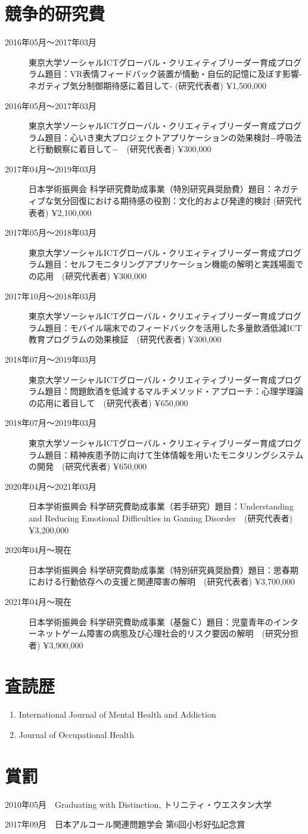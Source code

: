 \documentclass{article}
\begin{document}
\section{競争的研究費}
\begin{description}
	\item [2016年05月〜2017年03月]	 東京大学ソーシャルICTグローバル・クリエィティブリーダー育成プログラム題目：VR表情フィードバック装置が情動・自伝的記憶に及ぼす影響-ネガティブ気分制御期待感に着目して- (研究代表者) ¥1,500,000
	\item [2016年05月〜2017年03月] 東京大学ソーシャルICTグローバル・クリエィティブリーダー育成プログラム題目：心いき東大プロジェクトアプリケーションの効果検討−呼吸法と行動観察に着目して−　(研究代表者) ¥300,000
	\item [2017年04月〜2019年03月] 日本学術振興会 科学研究費助成事業（特別研究員奨励費）題目：ネガティブな気分回復における期待感の役割：文化的および発達的検討 (研究代表者) ¥2,100,000
	\item [2017年05月〜2018年03月] 東京大学ソーシャルICTグローバル・クリエィティブリーダー育成プログラム題目：セルフモニタリングアプリケーション機能の解明と実践場面での応用　(研究代表者) ¥300,000
	\item [2017年10月〜2018年03月] 東京大学ソーシャルICTグローバル・クリエィティブリーダー育成プログラム題目：モバイル端末でのフィードバックを活用した多量飲酒低減ICT教育プログラムの効果検証　(研究代表者) ¥300,000
	\item [2018年07月〜2019年03月] 東京大学ソーシャルICTグローバル・クリエィティブリーダー育成プログラム題目：問題飲酒を低減するマルチメソッド・アプローチ：心理学理論の応用に着目して　(研究代表者) ¥650,000
	\item [2018年07月〜2019年03月] 東京大学ソーシャルICTグローバル・クリエィティブリーダー育成プログラム題目：精神疾患予防に向けて生体情報を用いたモニタリングシステムの開発　(研究代表者) ¥650,000
	\item [2020年04月〜2021年03月] 日本学術振興会 科学研究費助成事業（若手研究）題目：Understanding and Reducing Emotional Difficulties in Gaming Disorder　(研究代表者)　¥3,200,000
	\item [2020年04月〜現在] 日本学術振興会 科学研究費助成事業（特別研究員奨励費）題目：思春期における行動依存への支援と関連障害の解明　(研究代表者) ¥3,700,000
	\item [2021年04月〜現在] 日本学術振興会 科学研究費助成事業（基盤Ｃ）題目：児童青年のインターネットゲーム障害の病態及び心理社会的リスク要因の解明　(研究分担者) ¥3,900,000
\end{description}

\section{査読歴}
	\begin{enumerate}
	\item International Journal of Mental Health and Addiction
	\item Journal of Occupational Health
\end{enumerate}
\section{賞罰}
\begin{description}
	\item 2010年05月　Graduating with Distinction, トリニティ・ウエスタン大学
	\item 2017年09月　日本アルコール関連問題学会 第6回小杉好弘記念賞
\end{description}
\end{document}
